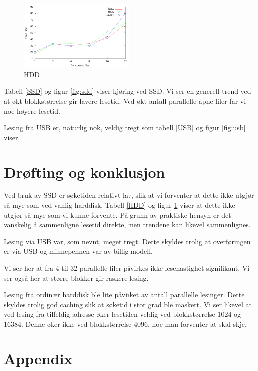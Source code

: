 \documentclass[titlepage]{article}
\begin{document}
\begin{figure}[h!]
  \caption{HDD}
  \label{fig:hdd}
  \centering
  \includegraphics[width=0.5\textwidth]{res/result-hdd}
\end{figure}

Tabell \ref{SSD} og figur \ref{fig:sdd} viser kjøring ved SSD. Vi ser
en generell trend ved at økt blokkstørrelse gir lavere lesetid. Ved
økt antall parallelle åpne filer får vi noe høyere lesetid.

Lesing fra USB er, naturlig nok, veldig tregt som tabell \ref{USB} og
figur \ref{fig:usb} viser.

\section{Drøfting og konklusjon}
Ved bruk av SSD er søketiden relativt lav, slik at vi forventer at
dette ikke utgjør så mye som ved vanlig harddisk. Tabell \ref{HDD} og
figur \ref{fig:hdd} viser at dette ikke utgjør så mye som vi kunne
forvente.  På grunn av praktiske hensyn er det vanskelig å sammenligne
lesetid direkte, men trendene kan likevel sammenlignes.

Lesing via USB var, som nevnt, meget tregt.  Dette skyldes trolig at
overføringen er via USB og minnepennen var av billig modell.

Vi ser her at fra 4 til 32 parallelle filer påvirkes ikke
lesehastighet signifikant. Vi ser også her at større blokker gir
raskere lesing.

Lesing fra ordinær harddisk ble lite påvirket av antall parallelle
lesinger. Dette skyldes trolig god caching slik at søketid i stor grad
ble maskert. Vi ser likevel at ved lesing fra tilfeldig adresse øker
lesetiden veldig ved blokkstørrelse 1024 og 16384. Denne øker ikke ved
blokkstørrelse 4096, noe man forventer at skal skje.



\clearpage
\section{Appendix}
\end{document}
